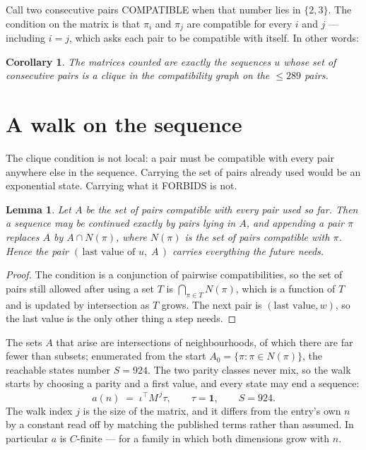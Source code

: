 \documentclass[11pt,a4paper]{article}
\theoremstyle{plain}
\newtheorem{lemma}[theorem]{Lemma}
\newtheorem{corollary}[theorem]{Corollary}
\theoremstyle{definition}
\begin{document}
Call two consecutive pairs COMPATIBLE when that number lies in $\{2,3\}$. The condition on the
matrix is that $\pi_i$ and $\pi_j$ are compatible for every $i$ and $j$ --- including $i=j$,
which asks each pair to be compatible with itself. In other words:

\begin{corollary}
The matrices counted are exactly the sequences $u$ whose set of consecutive pairs is a clique in
the compatibility graph on the $\le 289$ pairs.
\end{corollary}

\section{A walk on the sequence}

The clique condition is not local: a pair must be compatible with every pair anywhere else in
the sequence. Carrying the set of pairs already used would be an exponential state. Carrying
what it FORBIDS is not.

\begin{lemma}\label{lem:lump}
Let $A$ be the set of pairs compatible with every pair used so far. Then a sequence may be
continued exactly by pairs lying in $A$, and appending a pair $\pi$ replaces $A$ by
$A\cap N(\pi)$, where $N(\pi)$ is the set of pairs compatible with $\pi$. Hence the pair
$(\,\text{last value of }u,\;A\,)$ carries everything the future needs.
\end{lemma}

\begin{proof}
The condition is a conjunction of pairwise compatibilities, so the set of pairs still allowed
after using a set $T$ is $\bigcap_{\pi\in T}N(\pi)$, which is a function of $T$ and is updated
by intersection as $T$ grows. The next pair is $(\text{last value},w)$, so the last value is
the only other thing a step needs.
\end{proof}

The sets $A$ that arise are intersections of neighbourhoods, of which there are far fewer than
subsets; enumerated from the start $A_0=\{\pi:\pi\in N(\pi)\}$, the reachable states number
$S=924$. The two parity classes never mix, so the walk starts by choosing a parity and a first
value, and every state may end a sequence:
\[
a(n)\;=\;\iota^{\!\top}M^{\,j}\tau ,\qquad \tau=\mathbf{1},\qquad S=924.
\]
The walk index $j$ is the size of the matrix, and it differs from the entry's own $n$ by a
constant read off by matching the published terms rather than assumed. In particular $a$ is
$C$-finite --- for a family in which both dimensions grow with $n$.
\end{document}
